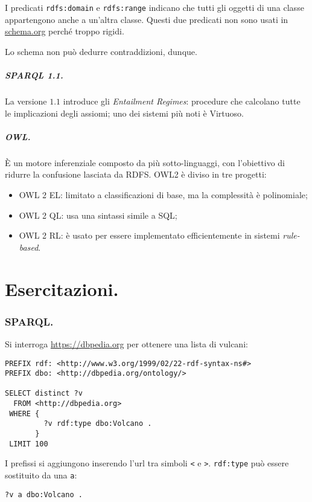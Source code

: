 \documentclass[11pt]{article}
\begin{document}
\begin{multicols}{2}
I predicati \verb|rdfs:domain| e \verb|rdfs:range| indicano che tutti gli oggetti di una classe appartengono anche a un'altra classe.
Questi due predicati non sono usati in \url{schema.org} perché troppo rigidi.

Lo schema non può dedurre contraddizioni, dunque.

\subsubsection{SPARQL 1.1.}
La versione $1.1$ introduce gli \textit{Entailment Regimes}: procedure che calcolano tutte le implicazioni degli assiomi; uno dei sistemi più noti è Virtuoso.

\subsubsection{OWL.}
È un motore inferenziale composto da più sotto-linguaggi, con l'obiettivo di ridurre la confusione lasciata da RDFS.
OWL2 è diviso in tre progetti:
\begin{itemize}
  \item OWL 2 EL: limitato a classificazioni di base, ma la complessità è polinomiale;
  \item OWL 2 QL: usa una sintassi simile a SQL;
  \item OWL 2 RL: è usato per  essere implementato efficientemente in sistemi \textit{rule-based}.
\end{itemize}


\newpage
\end{multicols}
\part{Esercitazioni.}

\section{SPARQL.}
Si interroga \url{https://dbpedia.org} per ottenere una lista di vulcani:
\begin{verbatim}
PREFIX rdf: <http://www.w3.org/1999/02/22-rdf-syntax-ns#>
PREFIX dbo: <http://dbpedia.org/ontology/>

SELECT distinct ?v
  FROM <http://dbpedia.org>
 WHERE {
         ?v rdf:type dbo:Volcano .
       }
 LIMIT 100
\end{verbatim}
I prefissi si aggiungono inserendo l'url tra simboli \verb|<| e \verb|>|.
\verb|rdf:type| può essere sostituito da una \verb|a|:
\begin{verbatim}
?v a dbo:Volcano .
\end{verbatim}
\end{document}
